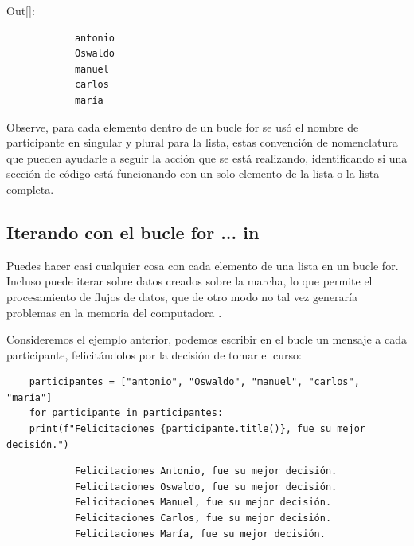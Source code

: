 {\ttfamily\scriptsize\scriptsize 
	\noindent Out[]: \vspace{-0.3cm}	
	{\color{blue} 	
		\begin{verbatim}		
			antonio
			Oswaldo
			manuel
			carlos
			maría
		\end{verbatim}
}}
\noindent Observe, para cada elemento dentro de un bucle {\ttfamily for} se usó el nombre de participante en singular y plural para la lista,  estas convención de nomenclatura que pueden ayudarle a seguir la acción que se está realizando,
identificando si una sección de código está funcionando con un solo elemento de la lista o la lista completa.


\subsection{Iterando con el bucle {\ttfamily for ... in} }


Puedes hacer casi cualquier cosa con cada elemento de una lista en un bucle {\ttfamily for}. Incluso puede iterar sobre datos creados sobre la marcha, lo que permite el procesamiento de flujos de datos, que de otro modo no tal vez generaría problemas en la memoria del computadora .


Consideremos el ejemplo anterior,  podemos escribir en el bucle un mensaje a cada participante, felicitándolos por la decisión de tomar el curso:

\hspace{-2.3cm}{\ttfamily \scriptsize curso.py}  \vspace{-0.58cm}
\begin{lstlisting}		
	participantes = ["antonio", "Oswaldo", "manuel", "carlos", "maría"]
	for participante in participantes:
	print(f"Felicitaciones {participante.title()}, fue su mejor decisión.")	  
\end{lstlisting}	

{\ttfamily\scriptsize\scriptsize 
	\hspace{-0.65cm} \vspace{-0.3cm}	
	{\color{blue} 	
		\begin{verbatim}
			Felicitaciones Antonio, fue su mejor decisión.
			Felicitaciones Oswaldo, fue su mejor decisión.
			Felicitaciones Manuel, fue su mejor decisión.
			Felicitaciones Carlos, fue su mejor decisión.
			Felicitaciones María, fue su mejor decisión.
		\end{verbatim}
}}

